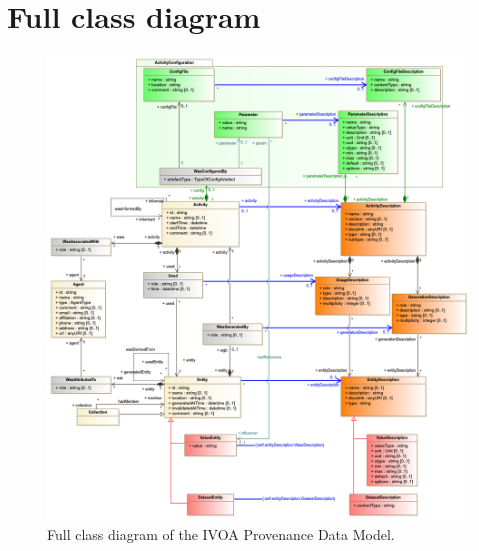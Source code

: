 \documentclass[11pt,a4paper]{ivoa}
\begin{document}
%


\section{Full class diagram}
\label{sec:fulldiagram}

\begin{figure}[h]
\centering
\hspace*{-.13\textwidth} 
\includegraphics[width=1.26\textwidth]{2019-05-28_fullview.png}
\caption[Full class diagram of the IVOA Provenance Data Model]{Full class diagram of the IVOA Provenance Data Model.}
\label{fig:fulldiagram}
\end{figure}
\end{document}
